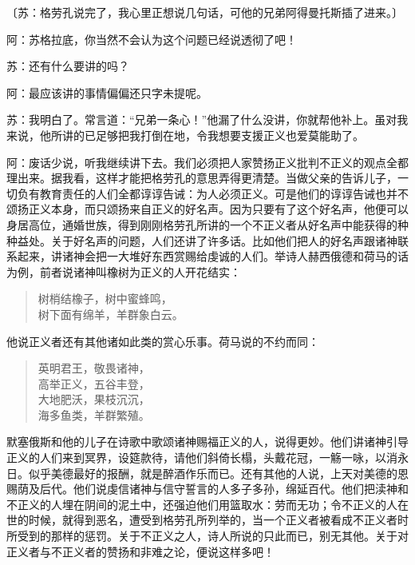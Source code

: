 \documentclass[11pt,oneside]{book}
\begin{document}
\begin{common-format}
〔苏：格劳孔说完了，我心里正想说几句话，可他的兄弟阿得曼托斯插了进来。〕

阿：苏格拉底，你当然不会认为这个问题已经说透彻了吧！

苏：还有什么要讲的吗？

阿：最应该讲的事情偏偏还只字未提呢。

苏：我明白了。常言道：“兄弟一条心！”他漏了什么没讲，你就帮他补上。虽对我来说，他所讲的已足够把我打倒在地，令我想要支援正义也爱莫能助了。

阿：废话少说，听我继续讲下去。我们必须把人家赞扬正义批判不正义的观点全都理出来。据我看，这样才能把格劳孔的意思弄得更清楚。当做父亲的告诉儿子，一切负有教育责任的人们全都谆谆告诫：为人必须正义。可是他们的谆谆告诫也并不颂扬正义本身，而只颂扬来自正义的好名声。因为只要有了这个好名声，他便可以身居高位，通婚世族，得到刚刚格劳孔所讲的一个不正义者从好名声中能获得的种种益处。关于好名声的问题，人们还讲了许多话。比如他们把人的好名声跟诸神联系起来，讲诸神会把一大堆好东西赏赐给虔诚的人们。举诗人赫西俄德和荷马的话为例，前者说诸神叫橡树为正义的人开花结实：
\begin{verse}
树梢结橡子，树中蜜蜂鸣，\\
树下面有绵羊，羊群象白云。
\end{verse}
他说正义者还有其他诸如此类的赏心乐事。荷马说的不约而同：
\begin{verse}
英明君王，敬畏诸神，\\
高举正义，五谷丰登，\\
大地肥沃，果枝沉沉，\\
海多鱼类，羊群繁殖。
\end{verse}

默塞俄斯和他的儿子在诗歌中歌颂诸神赐福正义的人，说得更妙。他们讲诸神引导正义的人们来到冥界，设筵款待，请他们斜倚长榻，头戴花冠，一觞一咏，以消永日。似乎美德最好的报酬，就是醉酒作乐而已。还有其他的人说，上天对美德的恩赐荫及后代。他们说虔信诸神与信守誓言的人多子多孙，绵延百代。他们把渎神和不正义的人埋在阴间的泥土中，还强迫他们用篮取水：劳而无功；令不正义的人在世的时候，就得到恶名，遭受到格劳孔所列举的，当一个正义者被看成不正义者时所受到的那样的惩罚。关于不正义之人，诗人所说的只此而已，别无其他。关于对正义者与不正义者的赞扬和非难之论，便说这样多吧！


\end{common-format}
\end{document}
